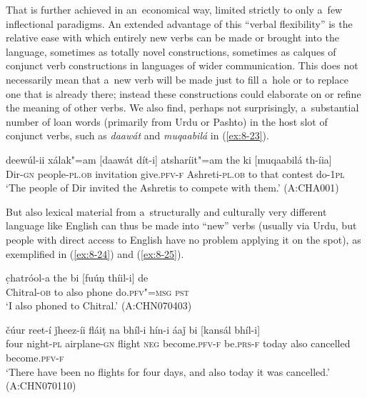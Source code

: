 That is further achieved in an~economical way, limited strictly to only a~few inflectional paradigms. An extended advantage of this ``verbal flexibility'' is the relative ease with which entirely new verbs can be made or brought into the language, sometimes as totally novel constructions, sometimes as calques of conjunct verb constructions in languages of wider communication. This does not necessarily mean that a~new verb will be made just to fill a~hole or to replace one that is already there; instead these constructions could elaborate on or refine the meaning of other verbs. We also find, perhaps not surprisingly, a~substantial number of loan words (primarily from Urdu or Pashto) in the host slot of conjunct verbs, such as \textit{daawát} and \textit{muqaabilá} in (\ref{ex:8-23}).

\begin{exe}
\ex
\label{ex:8-23}
\gll deewúl-ii xálak"=am [daawát dít-i] atsharíit"=am the ki [muqaabilá th-íia] \\
Dir-\textsc{gn} people-\textsc{pl.ob} invitation give.\textsc{pfv-f} Ashreti-\textsc{pl.ob} to that contest do-\textsc{1pl} \\
\glt `The people of Dir invited the Ashretis to compete with them.' (A:CHA001)
\end{exe}

But also lexical material from a~structurally and culturally very different language like English can thus be made into ``new'' verbs (usually via Urdu, but people with direct access to English have no problem applying it on the spot), as exemplified in (\ref{ex:8-24}) and (\ref{ex:8-25}).

\begin{exe}
\ex
\label{ex:8-24}
\gll c̣hatróol-a the bi [fuúṇ thíil-i] de \\
Chitral-\textsc{ob} to also phone do.\textsc{pfv"=msg} \textsc{pst} \\
\glt `I also phoned to Chitral.' (A:CHN070403)
\end{exe}
\begin{exe}
\ex
\label{ex:8-25}
\gll čúur reet-í ǰheez-íi fláiṭ na bhíl-i  hín-i áaǰ bi [kansál
  bhíl-i]  \\
four night-\textsc{pl} airplane-\textsc{gn} flight \textsc{neg} become.\textsc{pfv-f}  be.\textsc{prs-f} today also cancelled become.\textsc{pfv-f}  \\
\glt `There have been no flights for four days, and also today it was cancelled.' (A:CHN070110)
\end{exe}

